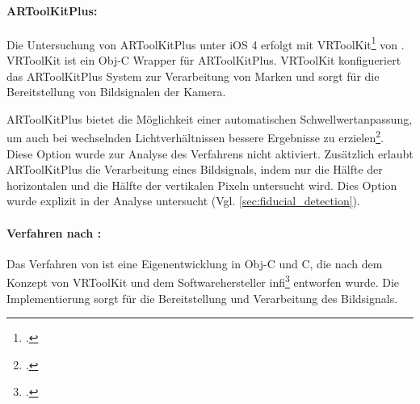 \paragraph{ARToolKitPlus:} %
\label{par:artoolkitplus}
Die Untersuchung von ARToolKitPlus unter iOS 4 erfolgt mit VRToolKit\footcite[Vgl.][]{vrtoolkit} von
 \citeauthor{vrtoolkit}. VRToolKit ist ein Obj-C Wrapper für ARToolKitPlus. VRToolKit konfigueriert das ARToolKitPlus
 System zur Verarbeitung von Marken und sorgt für die Bereitstellung von Bildsignalen der Kamera.

ARToolKitPlus bietet die Möglichkeit einer automatischen Schwellwertanpassung, um auch bei wechselnden
 Lichtverhältnissen bessere Ergebnisse zu erzielen\footcite[Vgl.][S.~142]{wagner07b}. Diese Option wurde zur Analyse
 des Verfahrens nicht aktiviert. Zusätzlich erlaubt ARToolKitPlus die Verarbeitung eines Bildsignals, indem nur die
 Hälfte der horizontalen und die Hälfte der vertikalen Pixeln untersucht wird. Dies Option wurde explizit in der
 Analyse untersucht (Vgl. \autoref{sec:fiducial_detection}).

\paragraph{Verfahren nach \citeauthor{hirzer08}:} %
\label{par:verfahren_nach_hirzer}
Das Verfahren von \citeauthor{hirzer08} ist eine Eigenentwicklung in Obj-C und C, die nach dem Konzept von VRToolKit und
 dem Softwarehersteller infi\footcite[Vgl.][]{infi} entworfen wurde. Die Implementierung sorgt für die Bereitstellung
 und Verarbeitung des Bildsignals.

